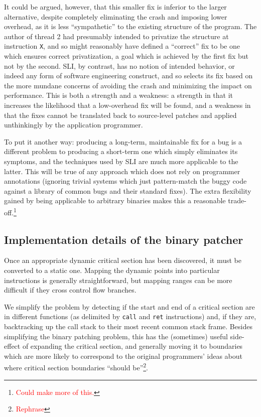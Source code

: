 \documentclass[10pt,twocolumn,preprint,natbib,authoryear]{sigplanconf}
\newcommand{\editorial}[1]{\textcolor{red}{\footnote{\textcolor{red}{#1}}}}
\begin{document}
It could be argued, however, that this smaller fix is inferior to the
larger alternative, despite completely eliminating the crash and
imposing lower overhead, as it is less ``sympathetic'' to the existing
structure of the program.  The author of thread 2 had presumably
intended to privatize the structure at instruction \verb|X|, and so
might reasonably have defined a ``correct'' fix to be one which
ensures correct privatization, a goal which is achieved by the first
fix but not by the second.  SLI, by contrast, has no notion of
intended behavior, or indeed any form of software engineering
construct, and so selects its fix based on the more mundane concerns
of avoiding the crash and minimizing the impact on performance.  This
is both a strength and a weakness: a strength in that it increases the
likelihood that a low-overhead fix will be found, and a weakness in
that the fixes cannot be translated back to source-level patches and
applied unthinkingly by the application programmer.

To put it another way: producing a long-term, maintainable fix for a
bug is a different problem to producing a short-term one which simply
eliminates its symptoms, and the techniques used by SLI are much more
applicable to the latter.  This will be true of any approach which
does not rely on programmer annotations (ignoring trivial systems
which just pattern-match the buggy code against a library of common
bugs and their standard fixes).  The extra flexibility gained by being
applicable to arbitrary binaries makes this a reasonable
trade-off.\editorial{Could make more of this.}

\subsection{Implementation details of the binary patcher}
\label{sect:binpatch}

Once an appropriate dynamic critical section has been discovered, it
must be converted to a static one.  Mapping the dynamic points into
particular instructions is generally straightforward, but mapping
ranges can be more difficult if they cross control flow branches.

We simplify the problem by detecting if the start and end of a
critical section are in different functions (as delimited by
\verb|call| and \verb|ret| instructions) and, if they are,
backtracking up the call stack to their most recent common stack
frame.  Besides simplifying the binary patching problem, this has the
(sometimes) useful side-effect of expanding the critical section, and
generally moving it to boundaries which are more likely to correspond
to the original programmers' ideas about where critical section
boundaries ``should be''\editorial{Rephrase}.
\end{document}
